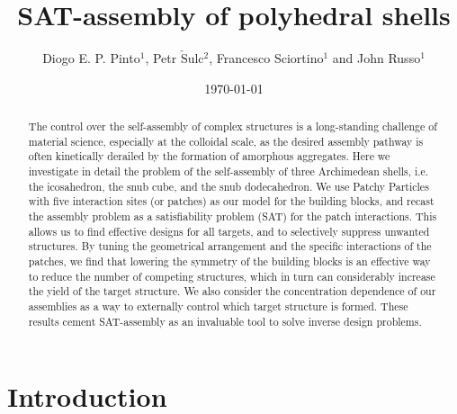 \documentclass[a4paper, amsfonts, amssymb, amsmath, reprint, showkeys, nofootinbib, oneside]{revtex4-1}
\begin{document}
\title{SAT-assembly of polyhedral shells}

\author{Diogo E. P. Pinto$^1$, Petr $\check{\text{S}}$ulc$^2$, Francesco Sciortino$^1$ and John Russo$^1$}

\date{\today} %

\begin{abstract}
The control over the self-assembly of complex structures is a long-standing challenge of material science, especially at the colloidal scale, as the desired assembly pathway is often kinetically derailed by the formation of amorphous aggregates. Here we investigate in detail the problem of the self-assembly of
three Archimedean shells,
i.e. the icosahedron, the snub cube, and the snub dodecahedron. We use Patchy Particles with five interaction sites (or patches) as our model for the building blocks, and recast the assembly problem as a satisfiability problem (SAT) for the patch interactions. This allows us to find effective designs for all targets, and to selectively suppress unwanted structures.
By tuning the geometrical arrangement and the specific interactions of the patches, we find 
that lowering the symmetry of the building blocks is an effective way to reduce the number of competing structures, which in turn can considerably increase the yield of the target structure. We also consider the concentration dependence of our assemblies as a way to externally control which target structure is formed. These results cement SAT-assembly as an invaluable tool to solve inverse design problems.
\end{abstract}

\maketitle

\section{Introduction}
\end{document}
